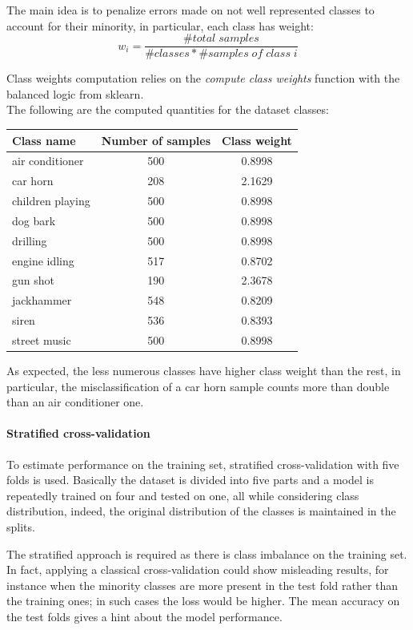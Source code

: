 The main idea is to penalize errors made on not well represented classes to account 
for their minority, in particular, each class has weight:
$$w_i = \frac{\#\mathit{total\;samples}}{\#\mathit{classes} * \#\mathit{samples\;of\;class\;i}}$$

Class weights computation relies on the \emph{compute class weights} function with the balanced logic
from sklearn.~\cite{classweight}\\
The following are the computed quantities for the dataset classes:
\begin{center}
    \begin{tabular}{ |l|c|c| } 
        \hline
        Class name & Number of samples & Class weight \\
        \hline
        air conditioner & 500 & 0.8998 \\
        car horn & 208 & 2.1629 \\
        children playing & 500 & 0.8998 \\
        dog bark & 500 & 0.8998 \\
        drilling & 500 & 0.8998 \\
        engine idling & 517 & 0.8702 \\
        gun shot & 190 & 2.3678 \\
        jackhammer & 548 & 0.8209 \\
        siren & 536 & 0.8393 \\
        street music & 500 & 0.8998 \\
        \hline
    \end{tabular}
\end{center}
As expected, the less numerous classes have higher class weight than the rest,
in particular, the misclassification of a car horn sample
counts more than double than an air conditioner one.

\paragraph{Stratified cross-validation}
To estimate performance on the training set, stratified cross-validation with 
five folds is used. Basically the dataset is divided into five parts 
and a model is repeatedly trained on four and tested on one, all while considering class 
distribution, indeed, the original distribution of the classes is maintained 
in the splits.~\cite{stratified}

The stratified approach is required as there is class imbalance on the training set.
In fact, applying a classical cross-validation could show misleading results, 
for instance when the minority classes are more present 
in the test fold rather than the training ones; in such cases the loss would be 
higher.
The mean accuracy on the test folds gives a hint about the model performance.


